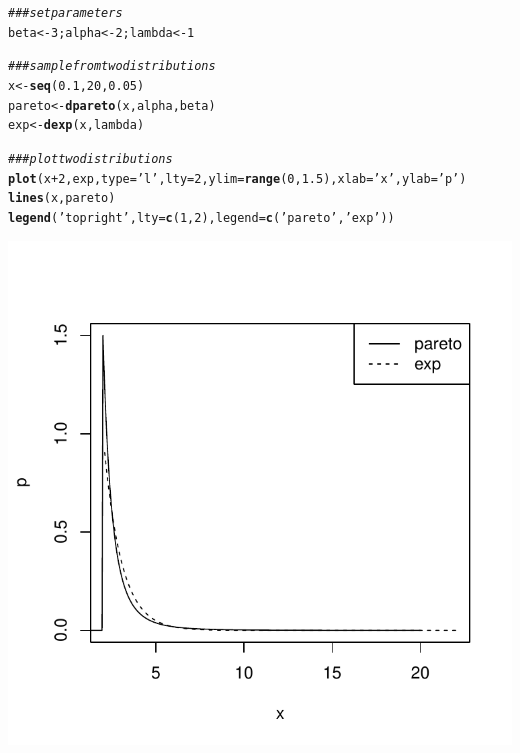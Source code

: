 \documentclass{article}\usepackage[]{graphicx}\usepackage[]{color}
\makeatletter
\def\maxwidth{ %
  \ifdim\Gin@nat@width>\linewidth
    \linewidth
  \else
    \Gin@nat@width
  \fi
}
\newcommand{\hlnum}[1]{\textcolor[rgb]{0.686,0.059,0.569}{#1}}%
\newcommand{\hlstr}[1]{\textcolor[rgb]{0.192,0.494,0.8}{#1}}%
\newcommand{\hlcom}[1]{\textcolor[rgb]{0.678,0.584,0.686}{\textit{#1}}}%
\newcommand{\hlopt}[1]{\textcolor[rgb]{0,0,0}{#1}}%
\newcommand{\hlstd}[1]{\textcolor[rgb]{0.345,0.345,0.345}{#1}}%
\newcommand{\hlkwb}[1]{\textcolor[rgb]{0.69,0.353,0.396}{#1}}%
\newcommand{\hlkwc}[1]{\textcolor[rgb]{0.333,0.667,0.333}{#1}}%
\newcommand{\hlkwd}[1]{\textcolor[rgb]{0.737,0.353,0.396}{\textbf{#1}}}%
\newenvironment{kframe}{%
 \def\at@end@of@kframe{}%
 \ifinner\ifhmode%
  \def\at@end@of@kframe{\end{minipage}}%
  \begin{minipage}{\columnwidth}%
 \fi\fi%
 \def\FrameCommand##1{\hskip\@totalleftmargin \hskip-\fboxsep
 \colorbox{shadecolor}{##1}\hskip-\fboxsep
     \hskip-\linewidth \hskip-\@totalleftmargin \hskip\columnwidth}%
 \MakeFramed {\advance\hsize-\width
   \@totalleftmargin\z@ \linewidth\hsize
   \@setminipage}}%
 {\par\unskip\endMakeFramed%
 \at@end@of@kframe}
\newenvironment{knitrout}{}{} %
\makeatother
\begin{document}
\begin{knitrout}
\color{fgcolor}\begin{kframe}
\begin{alltt}
\hlcom{###set parameters}
\hlstd{beta}\hlkwb{<-}\hlnum{3}\hlstd{;alpha}\hlkwb{<-}\hlnum{2}\hlstd{;lambda}\hlkwb{<-}\hlnum{1}

\hlcom{###sample from two distributions}
\hlstd{x}\hlkwb{<-}\hlkwd{seq}\hlstd{(}\hlnum{0.1}\hlstd{,}\hlnum{20}\hlstd{,}\hlnum{0.05}\hlstd{)}
\hlstd{pareto}\hlkwb{<-}\hlkwd{dpareto}\hlstd{(x,alpha,beta)}
\hlstd{exp}\hlkwb{<-}\hlkwd{dexp}\hlstd{(x,lambda)}

\hlcom{###plot two distributions}
\hlkwd{plot}\hlstd{(x}\hlopt{+}\hlnum{2}\hlstd{,exp,}\hlkwc{type}\hlstd{=}\hlstr{'l'}\hlstd{,}\hlkwc{lty}\hlstd{=}\hlnum{2}\hlstd{,}\hlkwc{ylim}\hlstd{=}\hlkwd{range}\hlstd{(}\hlnum{0}\hlstd{,}\hlnum{1.5}\hlstd{),}\hlkwc{xlab}\hlstd{=}\hlstr{'x'}\hlstd{,}\hlkwc{ylab}\hlstd{=}\hlstr{'p'}\hlstd{)}
\hlkwd{lines}\hlstd{(x,pareto)}
\hlkwd{legend}\hlstd{(}\hlstr{'topright'}\hlstd{,}\hlkwc{lty}\hlstd{=}\hlkwd{c}\hlstd{(}\hlnum{1}\hlstd{,}\hlnum{2}\hlstd{),}\hlkwc{legend}\hlstd{=}\hlkwd{c}\hlstd{(}\hlstr{'pareto'}\hlstd{,}\hlstr{'exp'}\hlstd{))}
\end{alltt}
\end{kframe}
\includegraphics[width=\maxwidth]{figure/r-chunk1-1} 

\end{knitrout}
\end{document}
